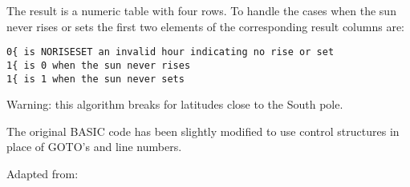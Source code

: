 The result is a numeric table with four rows. To handle the cases when
the sun never rises or sets the first two elements of the corresponding
result columns are:

\begin{verbatim}
0{ is NORISESET an invalid hour indicating no rise or set
1{ is 0 when the sun never rises
1{ is 1 when the sun never sets
\end{verbatim}

Warning: this algorithm breaks for latitudes close to the South pole.

The original BASIC code has been slightly modified to use control
structures in place of GOTO's and line numbers.

Adapted from:

\begin{Shaded}
\begin{Highlighting}[numbers=left,,]
 
 
 
\NormalTok{(}\NormalTok{) {-} }\NormalTok{ * }\NormalTok{) / }
\NormalTok{)}
\NormalTok{ * }\NormalTok{)}
\NormalTok{ * }
\NormalTok{ * }\NormalTok{(}
\NormalTok{) / (}
\NormalTok{(}
\NormalTok{)}

\end{Highlighting}
\end{Shaded}
